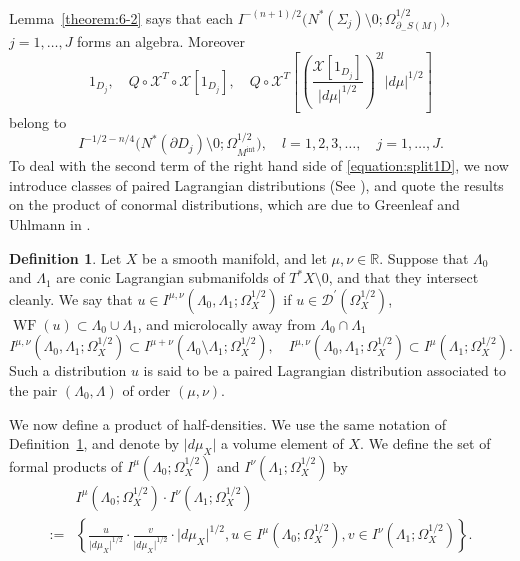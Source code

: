 \documentclass[a4paper,11pt,reqno]{amsart}
\numberwithin{equation}{section}
\theoremstyle{definition}
\newtheorem{definition}[theorem]{Definition}
\theoremstyle{remark}
\begin{document}
%
%
Lemma~\ref{theorem:6-2} says that each 
$I^{-(n+1)/2}\bigl(N^\ast(\Sigma_j)\setminus0; \Omega_{\partial_-S(M)}^{1/2}\bigr)$, 
$j=1,\dotsc,J$ forms an algebra. Moreover 
%
%
$$
1_{D_j},
\quad
Q\circ\mathcal{X}^T\circ\mathcal{X}[1_{D_j}], 
\quad
Q\circ\mathcal{X}^T
\left[
\left(
\frac{\mathcal{X}[1_{D_j}]}{\lvert{d\mu}\rvert^{1/2}}
\right)^{2l}
\lvert{d\mu}\rvert^{1/2}
\right]
$$
%
%
belong to 
%
%
$$
I^{-1/2-n/4}\bigl(N^\ast(\partial{D_j})\setminus0; \Omega_{M^\text{int}}^{1/2}\bigr),
\quad
l=1,2,3,\dotsc, \quad j=1,\dotsc,J.
$$
%
% 
To deal with the second term of the right hand side of \eqref{equation:split1D}, 
we now introduce classes of paired Lagrangian distributions 
(See \cite{MelroseUhlmann,GuilleminUhlmann,GreenleafUhlmann}), 
and quote the results on the product of conormal distributions, 
which are due to Greenleaf and Uhlmann in \cite{GreenleafUhlmann}.  
%
%
\begin{definition}
\label{theorem:6-3}
Let $X$ be a smooth manifold, and let $\mu, \nu \in \mathbb{R}$. 
Suppose that $\Lambda_0$ and $\Lambda_1$ 
are conic Lagrangian submanifolds of $T^\ast{X}\setminus0$, 
and that they intersect cleanly. 
We say that $u \in I^{\mu,\nu}(\Lambda_0,\Lambda_1;\Omega^{1/2}_X)$ 
if $u \in \mathcal{D}^\prime(\Omega^{1/2}_X)$, 
$\operatorname{WF}(u) \subset \Lambda_0\cup\Lambda_1$, and microlocally away from $\Lambda_0\cap\Lambda_1$ 
%
%
$$
I^{\mu,\nu}(\Lambda_0,\Lambda_1;\Omega^{1/2}_X)
\subset
I^{\mu+\nu}(\Lambda_0\setminus\Lambda_1;\Omega^{1/2}_X),
\quad
I^{\mu,\nu}(\Lambda_0,\Lambda_1;\Omega^{1/2}_X)
\subset
I^{\mu}(\Lambda_1;\Omega^{1/2}_X). 
$$
%
% 
Such a distribution $u$ is said to be a paired Lagrangian distribution associated 
to the pair $(\Lambda_0,\Lambda)$ of order $(\mu,\nu)$. 
\end{definition}
%
%
We now define a product of half-densities. 
We use the same notation of Definition~\ref{theorem:6-3}, and 
denote by $\lvert{d\mu_X}\rvert$ a volume element of $X$. 
We define the set of formal products of 
$I^\mu(\Lambda_0;\Omega^{1/2}_X)$ and $I^\nu(\Lambda_1;\Omega^{1/2}_X)$ by 
%
%
\begin{align*}
& I^\mu(\Lambda_0;\Omega^{1/2}_X){\cdot}I^\nu(\Lambda_1;\Omega^{1/2}_X)
\\
:=
& \left\{
\frac{u}{\lvert{d\mu_X}\rvert^{1/2}}
\cdot
\frac{v}{\lvert{d\mu_X}\rvert^{1/2}}
\cdot
\lvert{d\mu_X}\rvert^{1/2}, 
u \in I^\mu(\Lambda_0;\Omega^{1/2}_X), 
v \in I^\nu(\Lambda_1;\Omega^{1/2}_X) 
\right\}. 
\end{align*}
%
%
\par
%
\end{document}
